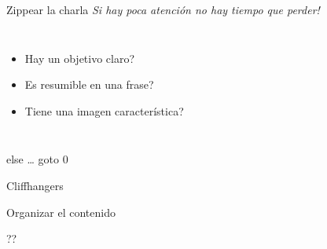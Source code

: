 \documentclass{beamer}
\begin{document}
\begin{frame}{Zippear la charla}
\textit{ Si hay poca atenci\'on no hay tiempo que perder! }
\begin{columns}[onlytextwidth]
    \begin{itemize}
        \item Hay un objetivo claro?
        \item Es resumible en una frase?
        \item Tiene una imagen caracter\'istica?
    \end{itemize}
    \begin{center}
    \end{center}
\end{columns}
else \ldots \alert{ goto } 0
\end{frame}

\begin{frame}{Cliffhangers}
\end{frame}

\begin{frame}{Organizar el contenido}
\end{frame}

\begin{frame}{??}
\end{frame}
\end{document}
